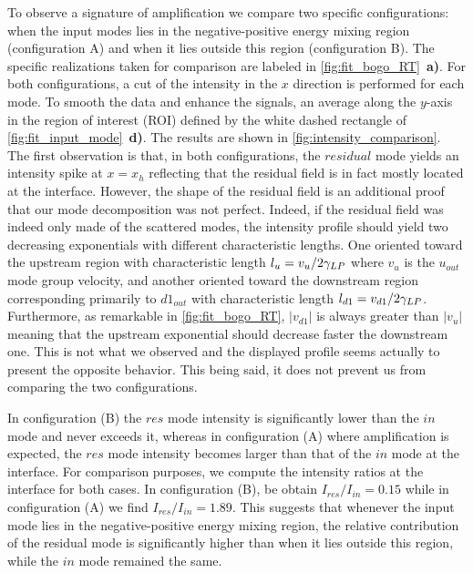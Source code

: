 To observe a signature of amplification we compare two specific configurations: when the input modes lies in the negative-positive energy mixing region (configuration A) and when it lies outside this region (configuration B). The specific 
realizations taken for comparison are labeled in \autoref{fig:fit_bogo_RT}~\textbf{a)}. For both configurations, a cut of the intensity in the $x$ direction is performed for each mode. To smooth the data and enhance the signals, an average along the $y$-axis in the region of interest (ROI) defined by the white dashed rectangle of \autoref{fig:fit_input_mode}~\textbf{d)}. 
The results are shown in \autoref{fig:intensity_comparison}. The first observation is that, in both configurations, the $residual$ mode yields an intensity spike at $x=x_h$ reflecting that the residual field is in fact mostly located at the interface. However, the shape of the residual field is an additional proof that our mode decomposition was not perfect. Indeed, if the residual field was indeed only made of the scattered modes, the intensity profile should yield two decreasing exponentials with different characteristic lengths.
One oriented toward the upstream region with characteristic length $l_u=v_u/2\gamma_{LP}$ where $v_u$ is the $u_{out}$ mode group velocity, and another oriented toward the downstream region corresponding primarily to $d1_{out}$ with characteristic length $l_{d1}=v_{d1}/2\gamma_{LP}$. Furthermore, as remarkable in \autoref{fig:fit_bogo_RT}, $|v_{d1}|$ is always greater than $|v_u|$ meaning that the upstream exponential should decrease faster the downstream one. This is not what we observed and the displayed profile seems actually to present the opposite behavior.
This being said, it does not prevent us from comparing the two configurations.


In configuration (B) the $res$ mode intensity is significantly lower than the $in$ mode and never exceeds it, whereas in configuration (A) where amplification is expected, the $res$ mode intensity becomes larger than that of the $in$ mode at the interface.
For comparison purposes, we compute the intensity ratios at the interface for both cases. In configuration (B), be obtain $I_{res}/I_{in} = 0.15$ while in configuration (A) we find $I_{res}/I_{in} = 1.89$. This suggests that whenever the input mode lies in the negative-positive energy mixing region, the relative contribution of the residual mode
is significantly higher than when it lies outside this region, while the $in$ mode remained the same. 

